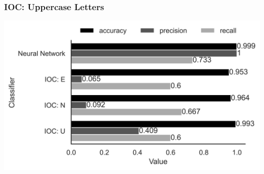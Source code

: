 \begin{frame}
\frametitle{IOC: Uppercase Letters}
\includegraphics[width=\textwidth]{res/performance-upper.png}
\end{frame}